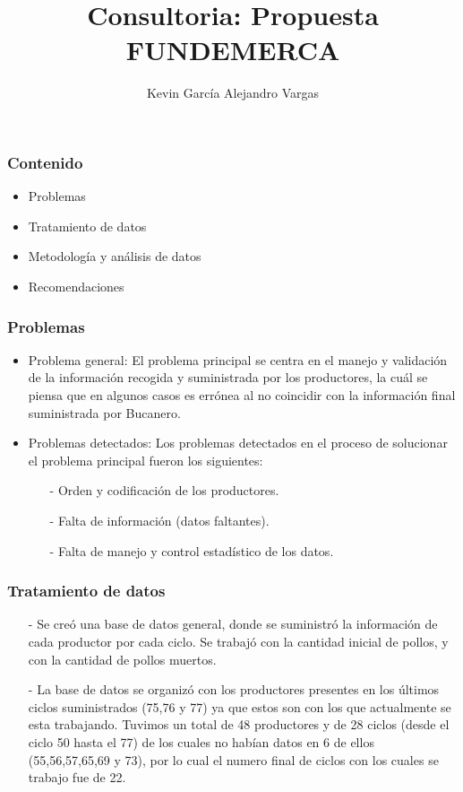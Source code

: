 \documentclass[11pt]{beamer}
\author[Kevin García - Alejandro Vargas]{Kevin García \newline Alejandro Vargas }
\title[Consultoria]{Consultoria: Propuesta FUNDEMERCA}
\begin{document}
\justify
\begin{frame}
\titlepage
\end{frame}


\begin{frame}
\frametitle{Contenido}
\begin{itemize}
\item Problemas
\item Tratamiento de datos
\item Metodología y análisis de datos
\item Recomendaciones
\end{itemize}
\end{frame}

\begin{frame}
\frametitle{Problemas}
\begin{itemize}
\item Problema general: El problema principal se centra en el manejo y validación de la información recogida y suministrada por los productores, la cuál se piensa que en algunos casos es errónea al no coincidir con la información final suministrada por Bucanero.
\item Problemas detectados: Los problemas detectados en el proceso de solucionar el problema principal fueron los siguientes:
\begin{itemize}
\item[-]Orden y codificación de los productores.
\item[-]Falta de información (datos faltantes).
\item[-]Falta de manejo y control estadístico de los datos.
\end{itemize}
\end{itemize}
\end{frame}

\begin{frame}
\frametitle{Tratamiento de datos}
\begin{itemize}
\item[-]Se creó una base de datos general, donde se suministró la información de cada productor por cada ciclo. Se trabajó con la cantidad inicial de pollos, y con la cantidad de pollos muertos.
\item[-]La base de datos se organizó con los productores presentes en los últimos ciclos suministrados (75,76 y 77) ya que estos son con los que actualmente se esta trabajando. Tuvimos un total de 48 productores y de 28 ciclos (desde el ciclo 50 hasta el 77) de los cuales no habían datos en 6 de ellos (55,56,57,65,69 y 73), por lo cual el numero final de ciclos con los cuales se trabajo fue de 22.
\end{itemize}
\end{frame}
\end{document}
